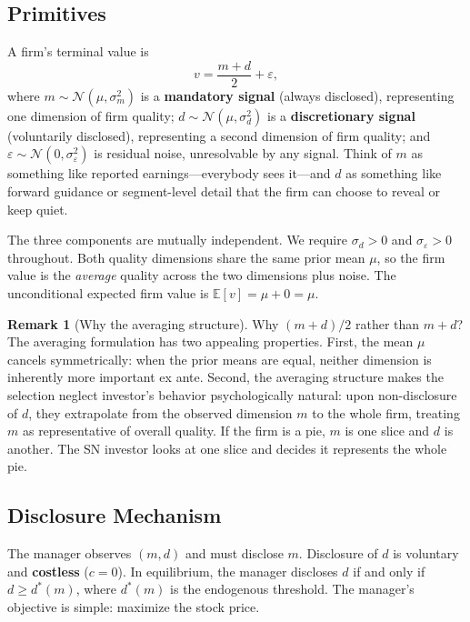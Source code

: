 \documentclass[12pt]{article}
\theoremstyle{plain}
\theoremstyle{definition}
\newtheorem{remark}{Remark}
\newcommand{\E}{\mathbb{E}}
\begin{document}
\subsection{Primitives}

A firm's terminal value is
\begin{equation}
v = \frac{m + d}{2} + \varepsilon,
\label{eq:value}
\end{equation}
where $m \sim \mathcal{N}(\mu, \sigma_m^2)$ is a \textbf{mandatory signal} (always disclosed), representing one dimension of firm quality; $d \sim \mathcal{N}(\mu, \sigma_d^2)$ is a \textbf{discretionary signal} (voluntarily disclosed), representing a second dimension of firm quality; and $\varepsilon \sim \mathcal{N}(0, \sigma_\varepsilon^2)$ is residual noise, unresolvable by any signal. Think of $m$ as something like reported earnings---everybody sees it---and $d$ as something like forward guidance or segment-level detail that the firm can choose to reveal or keep quiet.

The three components are mutually independent. We require $\sigma_d > 0$ and $\sigma_\varepsilon > 0$ throughout. Both quality dimensions share the same prior mean $\mu$, so the firm value is the \emph{average} quality across the two dimensions plus noise. The unconditional expected firm value is $\E[v] = \mu + 0 = \mu$.

\begin{remark}[Why the averaging structure]
Why $(m+d)/2$ rather than $m + d$? The averaging formulation has two appealing properties. First, the mean $\mu$ cancels symmetrically: when the prior means are equal, neither dimension is inherently more important ex ante. Second, the averaging structure makes the selection neglect investor's behavior psychologically natural: upon non-disclosure of $d$, they extrapolate from the observed dimension $m$ to the whole firm, treating $m$ as representative of overall quality. If the firm is a pie, $m$ is one slice and $d$ is another. The SN investor looks at one slice and decides it represents the whole pie.
\end{remark}

\subsection{Disclosure Mechanism}

The manager observes $(m, d)$ and must disclose $m$. Disclosure of $d$ is voluntary and \textbf{costless} ($c = 0$). In equilibrium, the manager discloses $d$ if and only if $d \geq d^*(m)$, where $d^*(m)$ is the endogenous threshold. The manager's objective is simple: maximize the stock price.
\end{document}
